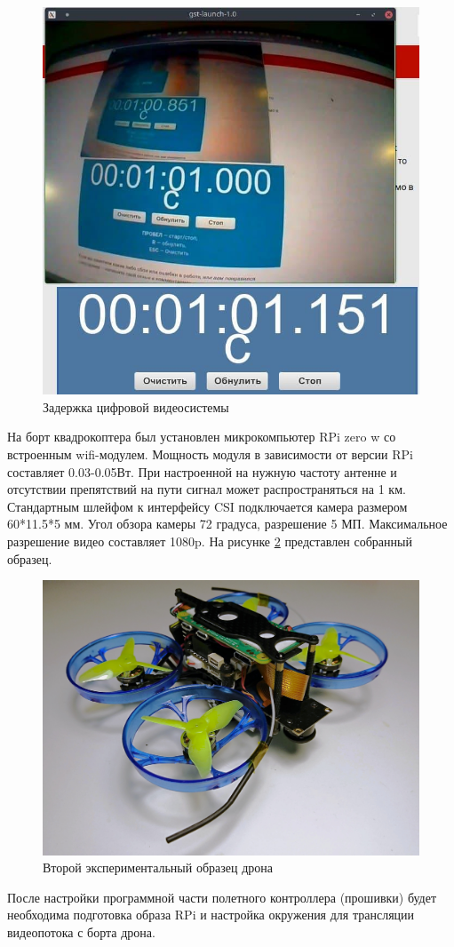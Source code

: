 \begin{figure}[H]
	\centering
	\includegraphics[width=0.5\linewidth]{./pics/time}
	\caption{Задержка цифровой видеосистемы
	}
	\label{fig:zadergka} %
\end{figure}

На борт квадрокоптера был установлен микрокомпьютер RPi zero w со встроенным wifi-модулем.
Мощность модуля в зависимости от версии RPi составляет 0.03-0.05Вт. При настроенной на нужную частоту антенне и отсутствии препятствий на пути сигнал может распространяться на 1 км.
Стандартным шлейфом к интерфейсу CSI подключается камера размером 60*11.5*5 мм. Угол обзора камеры 72 градуса, разрешение 5 МП. Максимальное разрешение видео составляет 1080p. На рисунке \ref{fig:drone1} представлен собранный образец.

\begin{figure}[H]
	\centering
	\includegraphics[width=0.5\linewidth]{./pics/drone}
	\caption{Второй экспериментальный образец дрона
	}
	\label{fig:drone1} %
\end{figure}

После настройки программной части полетного контроллера (прошивки) будет необходима подготовка образа RPi и настройка окружения для трансляции видеопотока с борта дрона.

